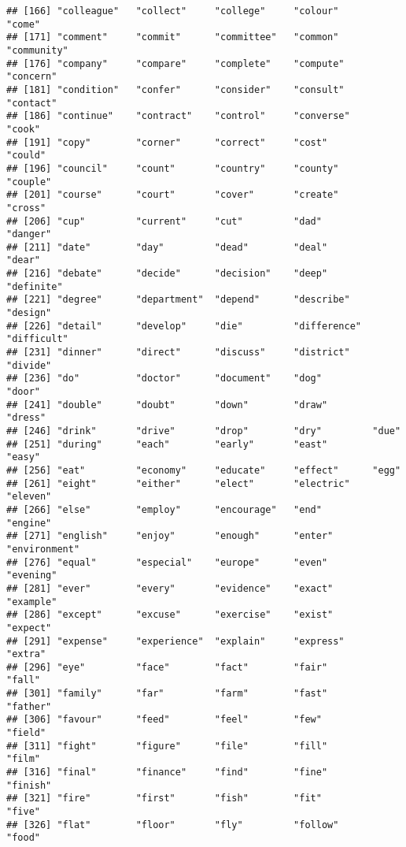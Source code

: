 \documentclass[
]{article}
\begin{document}
\begin{verbatim}
## [166] "colleague"   "collect"     "college"     "colour"      "come"       
## [171] "comment"     "commit"      "committee"   "common"      "community"  
## [176] "company"     "compare"     "complete"    "compute"     "concern"    
## [181] "condition"   "confer"      "consider"    "consult"     "contact"    
## [186] "continue"    "contract"    "control"     "converse"    "cook"       
## [191] "copy"        "corner"      "correct"     "cost"        "could"      
## [196] "council"     "count"       "country"     "county"      "couple"     
## [201] "course"      "court"       "cover"       "create"      "cross"      
## [206] "cup"         "current"     "cut"         "dad"         "danger"     
## [211] "date"        "day"         "dead"        "deal"        "dear"       
## [216] "debate"      "decide"      "decision"    "deep"        "definite"   
## [221] "degree"      "department"  "depend"      "describe"    "design"     
## [226] "detail"      "develop"     "die"         "difference"  "difficult"  
## [231] "dinner"      "direct"      "discuss"     "district"    "divide"     
## [236] "do"          "doctor"      "document"    "dog"         "door"       
## [241] "double"      "doubt"       "down"        "draw"        "dress"      
## [246] "drink"       "drive"       "drop"        "dry"         "due"        
## [251] "during"      "each"        "early"       "east"        "easy"       
## [256] "eat"         "economy"     "educate"     "effect"      "egg"        
## [261] "eight"       "either"      "elect"       "electric"    "eleven"     
## [266] "else"        "employ"      "encourage"   "end"         "engine"     
## [271] "english"     "enjoy"       "enough"      "enter"       "environment"
## [276] "equal"       "especial"    "europe"      "even"        "evening"    
## [281] "ever"        "every"       "evidence"    "exact"       "example"    
## [286] "except"      "excuse"      "exercise"    "exist"       "expect"     
## [291] "expense"     "experience"  "explain"     "express"     "extra"      
## [296] "eye"         "face"        "fact"        "fair"        "fall"       
## [301] "family"      "far"         "farm"        "fast"        "father"     
## [306] "favour"      "feed"        "feel"        "few"         "field"      
## [311] "fight"       "figure"      "file"        "fill"        "film"       
## [316] "final"       "finance"     "find"        "fine"        "finish"     
## [321] "fire"        "first"       "fish"        "fit"         "five"       
## [326] "flat"        "floor"       "fly"         "follow"      "food"       

\end{verbatim}
\end{document}
